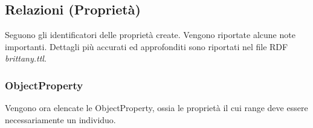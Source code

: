 \subsection{Relazioni (Proprietà)}
Seguono gli identificatori delle proprietà create. Vengono riportate alcune note importanti. Dettagli più accurati ed approfonditi sono riportati nel file RDF \textit{brittany.ttl}.

\newcommand\boldYellow[1]{\textcolor{yellow(munsell)}{\textbf{#1}}}

\subsubsection{ObjectProperty}
Vengono ora elencate le ObjectProperty, ossia le proprietà il cui range deve essere necessariamente un individuo.
